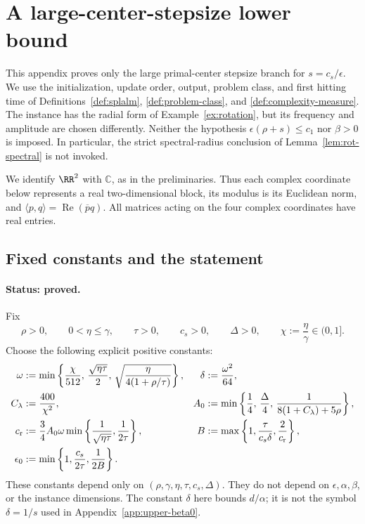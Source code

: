
\section{A large-center-stepsize lower bound}
\label{app:q3-large-alpha}

This appendix proves only the large primal-center stepsize branch for
\(s=c_s/\epsilon\). We use the initialization, update order, output,
problem class, and first hitting time of
Definitions~\ref{def:splalm}, \ref{def:problem-class}, and
\ref{def:complexity-measure}. The instance has the radial form of
Example~\ref{ex:rotation}, but its frequency and amplitude are chosen
differently. Neither the hypothesis \(\epsilon(\rho+s)\le c_1\) nor
\(\beta>0\) is imposed. In particular, the strict spectral-radius
conclusion of Lemma~\ref{lem:rot-spectral} is not invoked.

We identify \(\RR^2\) with \(\mathbb C\), as in the preliminaries.
Thus each complex coordinate below represents a real two-dimensional
block, its modulus is its Euclidean norm, and
\(\langle p,q\rangle=\operatorname{Re}(\overline p q)\).
All matrices acting on the four complex coordinates have real entries.

\subsection{Fixed constants and the statement}
\label{subsec:q3-large-constants}

\paragraph{Status: proved.}
Fix
\[
\rho>0,\qquad 0<\eta\le\gamma,\qquad
\tau>0,\qquad c_s>0,\qquad \Delta>0,
\qquad \chi:=\frac{\eta}{\gamma}\in(0,1].
\]
Choose the following explicit positive constants:
\begin{equation}
\begin{aligned}
\omega&:=\min\left\{
  \frac{\chi}{512},\,
  \frac{\sqrt{\eta\tau}}{2},\,
  \sqrt{\frac{\eta}{4(1+\rho/\tau)}}\right\},
&\delta&:=\frac{\omega^2}{64},\\
C_\lambda&:=\frac{400}{\chi^2},
&A_0&:=\min\left\{
  \frac14,\,\frac{\Delta}{4},\,
  \frac{1}{8(1+C_\lambda)+5\rho}\right\},\\
c_{\rm r}&:=\frac34 A_0\omega
  \min\left\{\frac{1}{\sqrt{\eta\tau}},\frac{1}{2\tau}\right\},
&B&:=\max\left\{1,\frac{\tau}{c_s\delta},\frac{2}{c_{\rm r}}\right\},\\
\epsilon_0&:=\min\left\{1,\frac{c_s}{2\tau},\frac{1}{2B}\right\}.
\end{aligned}
\label{eq:q3-large-fixed-constants}
\end{equation}
These constants depend only on
\((\rho,\gamma,\eta,\tau,c_s,\Delta)\). They do not depend on
\(\epsilon,\alpha,\beta\), or the instance dimensions.
The constant \(\delta\) here bounds \(d/\alpha\); it is not the
symbol \(\delta=1/s\) used in Appendix~\ref{app:upper-beta0}.

